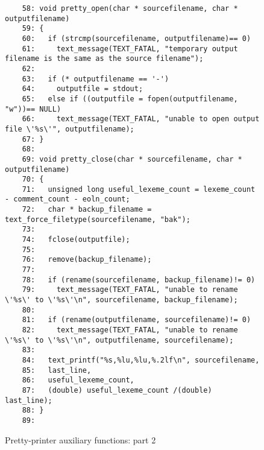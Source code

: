 \begin{figure}
\hspace*{-2.5cm}
\begin{minipage}{30cm}
\footnotesize
\begin{verbatim}
    58: void pretty_open(char * sourcefilename, char * outputfilename)
    59: {
    60:   if (strcmp(sourcefilename, outputfilename)== 0)
    61:     text_message(TEXT_FATAL, "temporary output filename is the same as the source filename"); 
    62:   
    63:   if (* outputfilename == '-')
    64:     outputfile = stdout; 
    65:   else if ((outputfile = fopen(outputfilename, "w"))== NULL)
    66:     text_message(TEXT_FATAL, "unable to open output file \'%s\'", outputfilename); 
    67: }
    68: 
    69: void pretty_close(char * sourcefilename, char * outputfilename)
    70: {
    71:   unsigned long useful_lexeme_count = lexeme_count - comment_count - eoln_count; 
    72:   char * backup_filename = text_force_filetype(sourcefilename, "bak"); 
    73:   
    74:   fclose(outputfile); 
    75:   
    76:   remove(backup_filename); 
    77:   
    78:   if (rename(sourcefilename, backup_filename)!= 0)
    79:     text_message(TEXT_FATAL, "unable to rename \'%s\' to \'%s\'\n", sourcefilename, backup_filename); 
    80:   
    81:   if (rename(outputfilename, sourcefilename)!= 0)
    82:     text_message(TEXT_FATAL, "unable to rename \'%s\' to \'%s\'\n", outputfilename, sourcefilename); 
    83:   
    84:   text_printf("%s,%lu,%lu,%.2lf\n", sourcefilename, 
    85:   last_line, 
    86:   useful_lexeme_count, 
    87:   (double) useful_lexeme_count /(double) last_line); 
    88: }
    89: 
\end{verbatim}
\end{minipage}
\caption{Pretty-printer auxiliary functions: part 2}
\label{pr_c_aux.c:2}
\end{figure}

